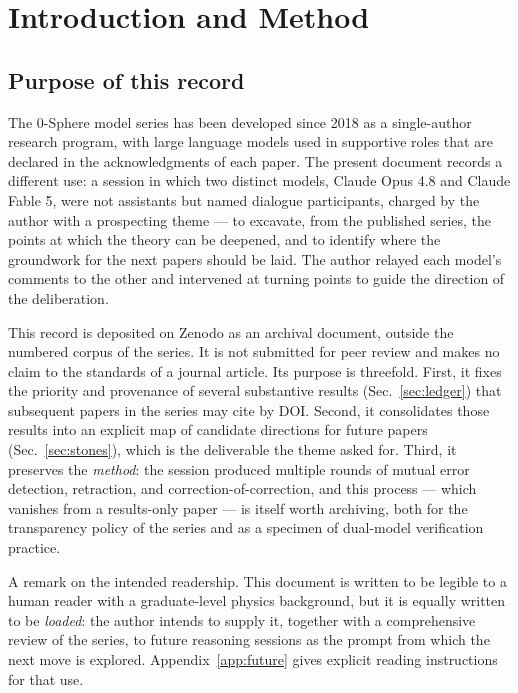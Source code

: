 \documentclass[%
 reprint, amsmath,amssymb, aps, prb, ]{revtex4-2}
\numberwithin{equation}{section}
\begin{document}
\maketitle

\section{Introduction and Method}
\label{sec:intro}

\subsection{Purpose of this record}

The 0-Sphere model series has been developed since 2018 as a single-author research program, with large language models used in supportive roles that are declared in the acknowledgments of each paper. The present document records a different use: a session in which two distinct models, Claude Opus 4.8 and Claude Fable 5, were not assistants but named dialogue participants, charged by the author with a prospecting theme --- to excavate, from the published series, the points at which the theory can be deepened, and to identify where the groundwork for the next papers should be laid. The author relayed each model's comments to the other and intervened at turning points to guide the direction of the deliberation.

This record is deposited on Zenodo as an archival document, outside the numbered corpus of the series. It is not submitted for peer review and makes no claim to the standards of a journal article. Its purpose is threefold. First, it fixes the priority and provenance of several substantive results (Sec.~\ref{sec:ledger}) that subsequent papers in the series may cite by DOI. Second, it consolidates those results into an explicit map of candidate directions for future papers (Sec.~\ref{sec:stones}), which is the deliverable the theme asked for. Third, it preserves the \emph{method}: the session produced multiple rounds of mutual error detection, retraction, and correction-of-correction, and this process --- which vanishes from a results-only paper --- is itself worth archiving, both for the transparency policy of the series and as a specimen of dual-model verification practice.

A remark on the intended readership. This document is written to be legible to a human reader with a graduate-level physics background, but it is equally written to be \emph{loaded}: the author intends to supply it, together with a comprehensive review of the series, to future reasoning sessions as the prompt from which the next move is explored. Appendix~\ref{app:future} gives explicit reading instructions for that use.
\end{document}
